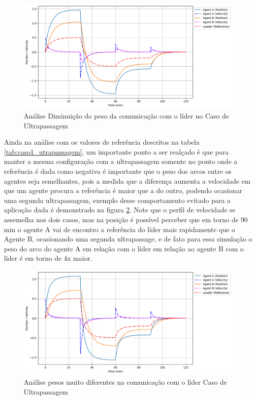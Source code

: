 \begin{figure}[ht]
    \centering
    \caption{Análise Diminuição do peso da comunicação com o líder no Caso de Ultrapassagem}
    \label{fig:case2_fig2}
    \includegraphics[width=1\linewidth]{figures/Simulation/Cooperativo/case2_fg2.png}
\end{figure}

Ainda na análise com os valores de referência descritos na tabela \ref{tab:caso1_utrapassagem}, um importante ponto a ser realçado é que para manter a mesma configuração com a ultrapassagem somente no ponto onde a referência é dada como negativa é importante que o peso dos arcos entre os agentes seja semelhantes, pois a medida que a diferença aumenta  a velocidade em que um agente procura a referência é maior que a do outro, podendo ocasionar uma segunda ultrapassagem, exemplo desse comportamento evitado para a aplicação dada é demonstrado na figura \ref{fig:case3_fig2}. Note que o perfil de velocidade se assemelha nos dois casos, mas na posição é possível perceber que em torno de 90 min o agente A vai de encontro a referência do líder mais rapidamente que o Agente B, ocasionando uma segunda ultrapassage, e de fato para essa simulação o peso do arco do agente A em relação com o líder em relação ao agente B com o líder é em torno de 4x maior.

\begin{figure}[ht]
    \centering
    \caption{Análise pesos muito diferentes na comunicação com o líder Caso de Ultrapassagem}
    \label{fig:case3_fig2}
    \includegraphics[width=1\linewidth]{figures/Simulation/Cooperativo/case3_fg2.png}
\end{figure}

